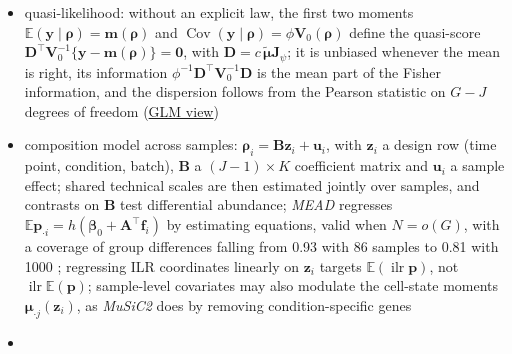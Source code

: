 \documentclass[pdflatex, sn-nature]{sn-jnl}
\theoremstyle{thmstyleone}%
\theoremstyle{thmstyletwo}%
\theoremstyle{thmstylethree}%
\newcommand{\vignette}[2]{\href{https://bastienchassagnol.github.io/DeCovarT/articles/#1}{#2}}
\begin{document}
\begin{itemize}
        law for \(\boldsymbol{y}_{\cdot i}\) (Gaussian, Poisson, negative binomial), the variance function above completes a
        generalised linear model; transformation-based methods such as \emph{DeOPUS} fix the gene weights in
        advance and have no likelihood \cite{nguyenDeOPUSCellularDeconvolution2026}
  \item quasi-likelihood: without an explicit law, the first two moments
        \(\mathbb{E}(\boldsymbol{y}\mid\boldsymbol{\rho})=\boldsymbol{m}(\boldsymbol{\rho})\) and \(\operatorname{Cov}(\boldsymbol{y}\mid\boldsymbol{\rho})=\phi\boldsymbol{V}_{0}(\boldsymbol{\rho})\) define the
        quasi-score \(\boldsymbol{D}^{\top}\boldsymbol{V}_{0}^{-1}\{\boldsymbol{y}-\boldsymbol{m}(\boldsymbol{\rho})\}=\boldsymbol{0}\), with
        \(\boldsymbol{D}=c\,\tilde{\boldsymbol{\mu}}\mathbf{J}_{\psi}\); it is unbiased whenever the mean is right, its information
        \(\phi^{-1}\boldsymbol{D}^{\top}\boldsymbol{V}_{0}^{-1}\boldsymbol{D}\) is the mean part of the Fisher information, and the dispersion follows
        from the Pearson statistic on \(G-J\) degrees of freedom
        (\vignette{01-2-population-inference.html\#sec-decovart-glm}{GLM view})
  \item composition model across samples: \(\boldsymbol{\rho}_{i}=\boldsymbol{B}\boldsymbol{z}_{i}+\boldsymbol{u}_{i}\), with \(\boldsymbol{z}_{i}\) a design row (time
        point, condition, batch), \(\boldsymbol{B}\) a \((J-1)\times K\) coefficient matrix and \(\boldsymbol{u}_{i}\) a sample effect;
        shared technical scales are then estimated jointly over samples, and contrasts on \(\boldsymbol{B}\) test
        differential abundance; \emph{MEAD} regresses \(\mathbb{E}\boldsymbol{p}_{\cdot i}=h(\boldsymbol{\beta}_{0}+\boldsymbol{A}^{\top}\boldsymbol{f}_{i})\) by estimating
        equations, valid when \(N=o(G)\), with a coverage of group differences falling from 0.93 with 86 samples to
        0.81 with 1000 \cite{xieStatisticalInferenceCell2026}; regressing ILR coordinates linearly on \(\boldsymbol{z}_{i}\)
        targets \(\mathbb{E}(\operatorname{ilr}\boldsymbol{p})\), not \(\operatorname{ilr}\mathbb{E}(\boldsymbol{p})\); sample-level covariates may also modulate
        the cell-state moments \(\boldsymbol{\mu}_{\cdot j}(\boldsymbol{z}_{i})\), as \emph{MuSiC2} does by removing condition-specific genes
        \cite{fanMusic2CellTypeDeconvolution2022}
  \item[] 
\end{itemize}
\end{document}
